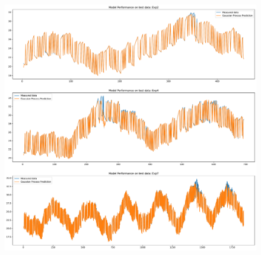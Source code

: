 \begin{figure}[ht]
    \centering
    \includegraphics[width = \textwidth]{Plots/GP_313_test_performance.pdf}
    \caption{}
    \label{fig:GP_313_test_validation}
\end{figure}

\clearpage
